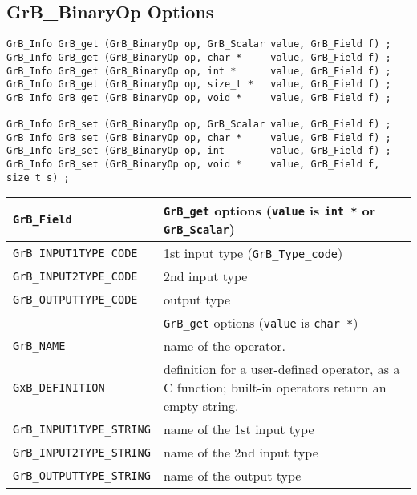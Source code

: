 \newpage
\subsection{{\sf GrB\_BinaryOp} Options}
\label{get_set_binop}

\begin{mdframed}[userdefinedwidth=6in]
{\footnotesize
\begin{verbatim}
GrB_Info GrB_get (GrB_BinaryOp op, GrB_Scalar value, GrB_Field f) ;
GrB_Info GrB_get (GrB_BinaryOp op, char *     value, GrB_Field f) ;
GrB_Info GrB_get (GrB_BinaryOp op, int *      value, GrB_Field f) ;
GrB_Info GrB_get (GrB_BinaryOp op, size_t *   value, GrB_Field f) ;
GrB_Info GrB_get (GrB_BinaryOp op, void *     value, GrB_Field f) ;

GrB_Info GrB_set (GrB_BinaryOp op, GrB_Scalar value, GrB_Field f) ;
GrB_Info GrB_set (GrB_BinaryOp op, char *     value, GrB_Field f) ;
GrB_Info GrB_set (GrB_BinaryOp op, int        value, GrB_Field f) ;
GrB_Info GrB_set (GrB_BinaryOp op, void *     value, GrB_Field f, size_t s) ;
\end{verbatim}
}\end{mdframed}

\noindent
{\small
\begin{tabular}{p{2.2in}p{3.5in}}
\hline
\hline
\verb'GrB_Field'                    & \verb'GrB_get' options (\verb'value' is \verb'int *' or \verb'GrB_Scalar') \\
\hline
\verb'GrB_INPUT1TYPE_CODE'          & 1st input type (\verb'GrB_Type_code') \\
\verb'GrB_INPUT2TYPE_CODE'          & 2nd input type \\
\verb'GrB_OUTPUTTYPE_CODE'          & output type \\
\hline
\hline
                                    & \verb'GrB_get' options (\verb'value' is \verb'char *') \\
\hline
\verb'GrB_NAME'                     & name of the operator. \\
\verb'GxB_DEFINITION'               & definition for a user-defined operator, as a C function; built-in operators
                                        return an empty string. \\
\verb'GrB_INPUT1TYPE_STRING'        & name of the 1st input type \\
\verb'GrB_INPUT2TYPE_STRING'        & name of the 2nd input type \\
\verb'GrB_OUTPUTTYPE_STRING'        & name of the output type \\
\hline
\end{tabular}
}

